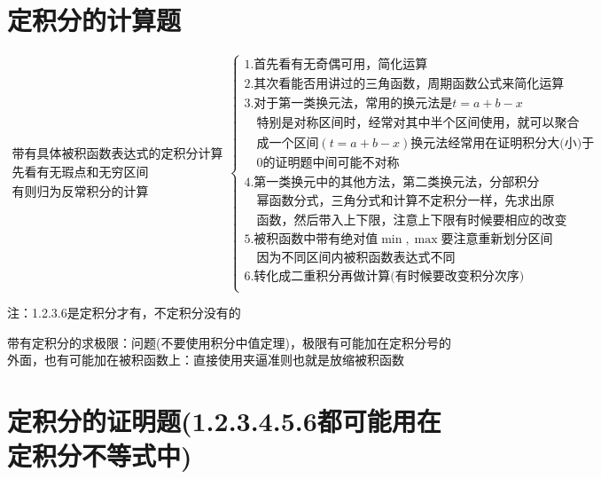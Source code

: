 \documentclass[a4paper,11pt]{book}
\begin{document}
\section*{定积分的计算题}

\[
    \begin{array}{c}
        \text{带有具体被积函数表达式的定积分计算}\\
        \text{先看有无瑕点和无穷区间}\\
        \text{有则归为反常积分的计算}
    \end{array}
    \begin{cases}
        \text{1.首先看有无奇偶可用，简化运算}\\
        \text{2.其次看能否用讲过的三角函数，周期函数公式来简化运算}\\
        \text{3.对于第一类换元法，常用的换元法是}t=a+b-x\\
        \quad \text{特别是对称区间时，经常对其中半个区间使用，就可以聚合}\\
        \quad \text{成一个区间}(t=a+b-x)\text{换元法经常用在证明积分大(小)于}\\
        \quad \text{0的证明题中间可能不对称}\\

        \text{4.第一类换元中的其他方法，第二类换元法，分部积分}\\
        \quad \text{幂函数分式，三角分式和计算不定积分一样，先求出原}\\
        \quad \text{函数，然后带入上下限，注意上下限有时候要相应的改变}\\

        \text{5.被积函数中带有绝对值}\min {},\max {}\text{要注意重新划分区间}\\
        \quad \text{因为不同区间内被积函数表达式不同}\\

        \text{6.转化成二重积分再做计算(有时候要改变积分次序)}\\
    \end{cases}
\]

注：1.2.3.6是定积分才有，不定积分没有的

带有定积分的求极限：问题(不要使用积分中值定理)，极限有可能加在定积分号的外面，也有可能加在被积函数上：直接使用夹逼准则也就是放缩被积函数

\section*{定积分的证明题(1.2.3.4.5.6都可能用在定积分不等式中)}
\end{document}
